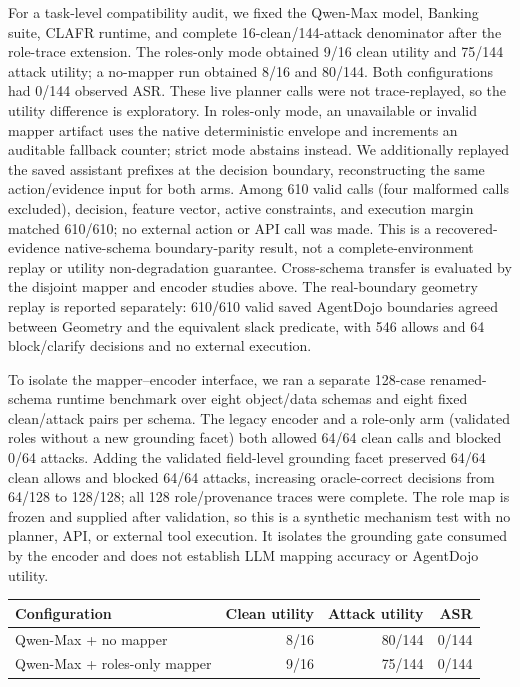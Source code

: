 \documentclass[letterpaper]{article}
\begin{document}
For a task-level compatibility audit, we fixed the Qwen-Max model, Banking suite, CLAFR runtime, and complete 16-clean/144-attack denominator after the role-trace extension. The roles-only mode obtained 9/16 clean utility and 75/144 attack utility; a no-mapper run obtained 8/16 and 80/144. Both configurations had 0/144 observed ASR. These live planner calls were not trace-replayed, so the utility difference is exploratory. In roles-only mode, an unavailable or invalid mapper artifact uses the native deterministic envelope and increments an auditable fallback counter; strict mode abstains instead. We additionally replayed the saved assistant prefixes at the decision boundary, reconstructing the same action/evidence input for both arms. Among 610 valid calls (four malformed calls excluded), decision, feature vector, active constraints, and execution margin matched 610/610; no external action or API call was made. This is a recovered-evidence native-schema boundary-parity result, not a complete-environment replay or utility non-degradation guarantee. Cross-schema transfer is evaluated by the disjoint mapper and encoder studies above. The real-boundary geometry replay is reported separately: 610/610 valid saved AgentDojo boundaries agreed between Geometry and the equivalent slack predicate, with 546 allows and 64 block/clarify decisions and no external execution.

To isolate the mapper--encoder interface, we ran a separate 128-case renamed-schema runtime benchmark over eight object/data schemas and eight fixed clean/attack pairs per schema. The legacy encoder and a role-only arm (validated roles without a new grounding facet) both allowed 64/64 clean calls and blocked 0/64 attacks. Adding the validated field-level grounding facet preserved 64/64 clean allows and blocked 64/64 attacks, increasing oracle-correct decisions from 64/128 to 128/128; all 128 role/provenance traces were complete. The role map is frozen and supplied after validation, so this is a synthetic mechanism test with no planner, API, or external tool execution. It isolates the grounding gate consumed by the encoder and does not establish LLM mapping accuracy or AgentDojo utility.

\begin{center}
\small
\begin{tabular}{lrrr}
\toprule
Configuration & Clean utility & Attack utility & ASR \\
\midrule
Qwen-Max + no mapper & 8/16 & 80/144 & 0/144 \\
Qwen-Max + roles-only mapper & 9/16 & 75/144 & 0/144 \\
\bottomrule
\end{tabular}
\end{center}
\end{document}
